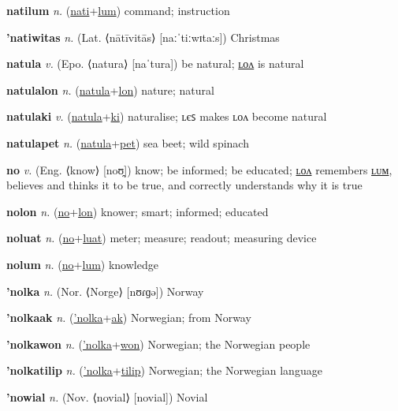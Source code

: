 \textbf{\hypertarget{natilum}{natilum}} \textit{n.} (\hyperlink{nati}{nati}+\allowbreak \hyperlink{lum}{lum})
command; instruction

\textbf{\hypertarget{'natiwitas}{'natiwitas}} \textit{n.} (Lat. ⟨nātīvitās⟩ [naːˈtiːwɪtaːs])
Christmas

\textbf{\hypertarget{natula}{natula}} \textit{v.} (Epo. ⟨natura⟩ [naˈtura])
be natural; \hyperlink{natulalon}{ʟᴏᴧ} is natural

\textbf{\hypertarget{natulalon}{natulalon}} \textit{n.} (\hyperlink{natula}{natula}+\allowbreak \hyperlink{lon}{lon})
nature; natural

\textbf{\hypertarget{natulaki}{natulaki}} \textit{v.} (\hyperlink{natula}{natula}+\allowbreak \hyperlink{ki}{ki})
naturalise; ʟєꜱ makes ʟᴏᴧ become natural

\textbf{\hypertarget{natulapet}{natulapet}} \textit{n.} (\hyperlink{natula}{natula}+\allowbreak \hyperlink{pet}{pet})
sea beet; wild spinach

\textbf{\hypertarget{no}{no}} \textit{v.} (Eng. ⟨know⟩ [noʊ̯])
know; be informed; be educated; \hyperlink{nolon}{ʟᴏᴧ} remembers \hyperlink{nolum}{ʟᴜᴍ}, believes and thinks it to be true, and correctly understands why it is true

\textbf{\hypertarget{nolon}{nolon}} \textit{n.} (\hyperlink{no}{no}+\allowbreak \hyperlink{lon}{lon})
knower; smart; informed; educated

\textbf{\hypertarget{noluat}{noluat}} \textit{n.} (\hyperlink{no}{no}+\allowbreak \hyperlink{luat}{luat})
meter; measure; readout; measuring device

\textbf{\hypertarget{nolum}{nolum}} \textit{n.} (\hyperlink{no}{no}+\allowbreak \hyperlink{lum}{lum})
knowledge

\textbf{\hypertarget{'nolka}{'nolka}} \textit{n.} (Nor. ⟨Norge⟩ [nʊɾɡə])
Norway

\textbf{\hypertarget{'nolkaak}{'nolkaak}} \textit{n.} (\hyperlink{'nolka}{'nolka}+\allowbreak \hyperlink{ak}{ak})
Norwegian; from Norway

\textbf{\hypertarget{'nolkawon}{'nolkawon}} \textit{n.} (\hyperlink{'nolka}{'nolka}+\allowbreak \hyperlink{won}{won})
Norwegian; the Norwegian people

\textbf{\hypertarget{'nolkatilip}{'nolkatilip}} \textit{n.} (\hyperlink{'nolka}{'nolka}+\allowbreak \hyperlink{tilip}{tilip})
Norwegian; the Norwegian language

\textbf{\hypertarget{'nowial}{'nowial}} \textit{n.} (Nov. ⟨novial⟩ [novial])
Novial


